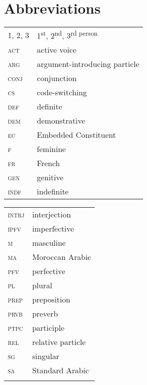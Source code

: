 \documentclass[output=paper]{langscibook}
\begin{document}
\section*{Abbreviations}
\begin{tabularx}{.45\textwidth}{>{\scshape}lQ}
1, 2, 3 & 1\textsuperscript{st}, 2\textsuperscript{nd}, 3\textsuperscript{rd person}\\
act & active voice\\
arg &argument-introducing particle\\
conj & conjunction\\
cs & code-switching\\
def & definite\\
dem & demonstrative\\
ec & Embedded Constituent\\
f & feminine\\
fr & French\\
gen & genitive\\
indf & indefinite\\
\end{tabularx}
\begin{tabularx}{.45\textwidth}{>{\scshape}lQ}
intrj & interjection\\
ipfv & imperfective\\
m & masculine\\
ma & Moroccan Arabic\\
pfv & perfective\\
pl & plural\\
prep & preposition\\
prvb & preverb\\
ptpc & participle\\
rel & relative particle\\
sg & singular\\
sa & Standard Arabic\\
\\
\end{tabularx}




\printbibliography[heading=subbibliography, notkeyword=this]
\end{document}
